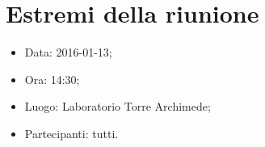 \documentclass[../template.tex]{subfiles}
\begin{document}
\section{Estremi della riunione}
	\begin{itemize}
		\item Data: 2016-01-13;
		\item Ora: 14:30;
		\item Luogo: Laboratorio Torre Archimede;
		\item Partecipanti: tutti.
	\end{itemize}
\end{document}
